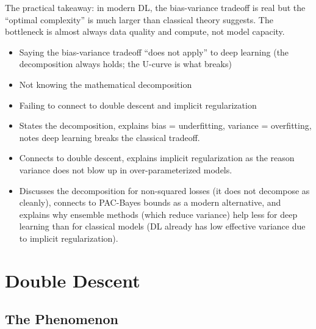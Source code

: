 \begin{interviewq}
The practical takeaway: in modern DL, the bias-variance tradeoff is real but the ``optimal complexity'' is much larger than classical theory suggests. The bottleneck is almost always data quality and compute, not model capacity.

\redflags
\begin{itemize}
    \item Saying the bias-variance tradeoff ``does not apply'' to deep learning (the decomposition always holds; the U-curve is what breaks)
    \item Not knowing the mathematical decomposition
    \item Failing to connect to double descent and implicit regularization
\end{itemize}


\goodgreat
\begin{itemize}
    \item {} States the decomposition, explains bias = underfitting, variance = overfitting, notes deep learning breaks the classical tradeoff.
    \item {} Connects to double descent, explains implicit regularization as the reason variance does not blow up in over-parameterized models.
    \item {} Discusses the decomposition for non-squared losses (it does not decompose as cleanly), connects to PAC-Bayes bounds as a modern alternative, and explains why ensemble methods (which reduce variance) help less for deep learning than for classical models (DL already has low effective variance due to implicit regularization).
\end{itemize}

\end{interviewq}

\section{Double Descent}
\label{sec:double_descent}

\subsection{The Phenomenon}

